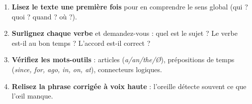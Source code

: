 \documentclass[11pt]{article}
\begin{document}
\begin{methode}
\begin{enumerate}
\item \textbf{Lisez le texte une première fois} pour en comprendre le sens global (qui ? quoi ? quand ? où ?).
\item \textbf{Surlignez chaque verbe} et demandez-vous : quel est le sujet ? Le verbe est-il au bon temps ? L'accord est-il correct ?
\item \textbf{Vérifiez les mots-outils} : articles (\emph{a/an/the/Ø}), prépositions de temps (\emph{since, for, ago, in, on, at}), connecteurs logiques.
\item \textbf{Relisez la phrase corrigée à voix haute} : l'oreille détecte souvent ce que l'œil manque.
\end{enumerate}
\end{methode}
\end{document}
